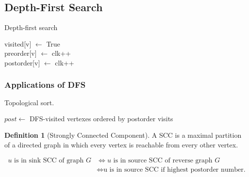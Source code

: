 \documentclass[11pt]{article}
\theoremstyle{definition}
\newtheorem{definition}{Definition}[section]
\theoremstyle{remark}
\begin{document}
\subsection{Depth-First Search}
\begin{algorithm}[ht]
    \caption{Depth-first search}
 
    \DontPrintSemicolon
    
    
	 {
		visited[v] $\gets$ True \\
		preorder[v] $\gets$ clk++ \\
		postorder[v] $\gets$ clk++ \\
	}
\end{algorithm}

\subsubsection{Applications of DFS}
\begin{algorithm}[ht]
    \caption{Topological sort.}
    
    \DontPrintSemicolon
    
    $post \gets$ DFS-visited vertexes ordered by postorder visits \\
\end{algorithm}

\begin{definition}[Strongly Connected Component]
A SCC is a maximal partition of a directed graph in which every vertex is reachable from every other vertex.
\end{definition}
\begin{align*}
u \text{ is in sink SCC of graph }G &\Leftrightarrow u \text{ is in source SCC of reverse graph }G \\ &\Leftrightarrow 
\text{u is in source SCC if highest postorder number.}
\end{align*}
\end{document}
